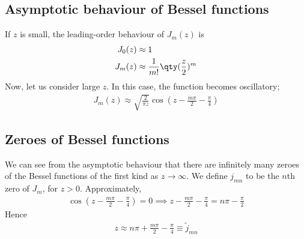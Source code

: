 \subsection{Asymptotic behaviour of Bessel functions}
If $z$ is small, the leading-order behaviour of $J_m(z)$ is
\begin{align*}
	J_0(z) & \approx 1                                \\
	J_m(z) & \approx \frac{1}{m!} \qty(\frac{z}{2})^m
\end{align*}
Now, let us consider large $z$.
In this case, the function becomes oscillatory;
\begin{align*}
	J_m(z) \approx \sqrt{\frac{2}{\pi z}} \cos(z - \frac{m \pi}{2} - \frac{\pi}{4})
\end{align*}

\subsection{Zeroes of Bessel functions}
We can see from the asymptotic behaviour that there are infinitely many zeroes of the Bessel functions of the first kind as $z \to \infty$.
We define $j_{mn}$ to be the $n$th zero of $J_m$, for $z > 0$.
Approximately,
\begin{align*}
	\cos(z - \frac{m \pi}{2} - \frac{\pi}{4}) = 0 \implies z - \frac{m \pi}{2} - \frac{\pi}{4} = n \pi - \frac{\pi}{2}
\end{align*}
Hence
\begin{align*}
	z \approx n \pi + \frac{m \pi}{2} - \frac{\pi}{4} \equiv \widetilde j_{mn}
\end{align*}

